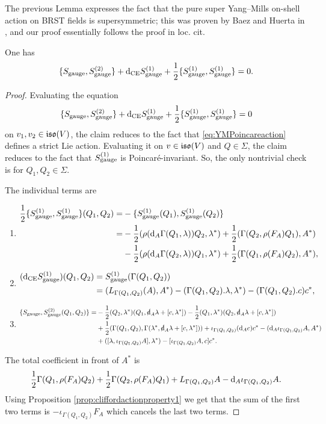\documentclass[10pt, oneside]{article}
\begin{document}
\begin{remark}
The previous Lemma expresses the fact that the pure super Yang--Mills on-shell action on BRST fields is supersymmetric; this was proven by Baez and Huerta in \cite{BaezHuerta}, and our proof essentially follows the proof in loc. cit.
\end{remark}

\begin{lemma}
One has
\[\{S_{\mathrm{gauge}}, S_{\mathrm{gauge}}^{(2)}\} + {\rm d}_{\mathrm{CE}} S_{\mathrm{gauge}}^{(1)} + \frac{1}{2}\{S_{\mathrm{gauge}}^{(1)}, S_{\mathrm{gauge}}^{(1)}\} = 0.\]
\label{lm:gaugemultiplet2}
\end{lemma}
\begin{proof}
Evaluating the equation
\[\{S_{\mathrm{gauge}}, S_{\mathrm{gauge}}^{(2)}\} + {\rm d}_{\mathrm{CE}} S_{\mathrm{gauge}}^{(1)} + \frac{1}{2}\{S_{\mathrm{gauge}}^{(1)}, S_{\mathrm{gauge}}^{(1)}\} = 0\]
on $v_1, v_2\in \mathfrak{iso}(V)$, the claim reduces to the fact that \eqref{eq:YMPoincareaction} defines a strict Lie action. Evaluating it on $v\in\mathfrak{iso}(V)$ and $Q\in\Sigma$, the claim reduces to the fact that $S_{\mathrm{gauge}}^{(1)}$ is Poincar\'{e}-invariant. So, the only nontrivial check is for $Q_1,Q_2\in\Sigma$.

The individual terms are
\begin{enumerate}
\item\begin{align*}
\frac{1}{2}\{S_{\mathrm{gauge}}^{(1)}, S_{\mathrm{gauge}}^{(1)}\}(Q_1, Q_2) = &-\{S_{\mathrm{gauge}}^{(1)}(Q_1), S_{\mathrm{gauge}}^{(1)}(Q_2)\} \\
= &-\frac{1}{2}(\rho({\rm d}_A \Gamma(Q_1, \lambda)) Q_2, \lambda^*) + \frac{1}{2}(\Gamma(Q_2, \rho(F_A)Q_1), A^*) \\
&-\frac{1}{2}(\rho({\rm d}_A \Gamma(Q_2, \lambda)) Q_1, \lambda^*) + \frac{1}{2}(\Gamma(Q_1, \rho(F_A)Q_2), A^*),
\end{align*}
\item\begin{align*}
({\rm d}_{\mathrm{CE}} S_{\mathrm{gauge}}^{(1)})(Q_1, Q_2) &= S_{\mathrm{gauge}}^{(1)}(\Gamma(Q_1, Q_2)) \\
&= (L_{\Gamma(Q_1, Q_2)}(A), A^*) -(\Gamma(Q_1, Q_2).\lambda, \lambda^*) - (\Gamma(Q_1, Q_2).c) c^*,
\end{align*}
\item 
\begin{align*}
\{S_{\gauge}, S_{\gauge}^{(2)}(Q_1, Q_2)\} = &-\frac{1}{2}(Q_2, \lambda^*)(Q_1, \sd{\d}_A \lambda + [c, \lambda^*]) - \frac{1}{2}(Q_1, \lambda^*)(Q_2, \sd{\d}_A \lambda + [c, \lambda^*]) \\
&+\frac{1}{2}(\Gamma(Q_1, Q_2), \Gamma(\lambda^*, \sd{\d}_A \lambda + [c, \lambda^*])) + \iota_{\Gamma(Q_1, Q_2)}(\d_A c) c^* - (\d_A\iota_{\Gamma(Q_1, Q_2)} A, A^*) \\
&+ ([\lambda, \iota_{\Gamma(Q_1, Q_2)}A], \lambda^*) - [\iota_{\Gamma(Q_1, Q_2)} A, c] c^*.
\end{align*}
\end{enumerate}
The total coefficient in front of $A^*$ is
\[\frac{1}{2}\Gamma(Q_1, \rho(F_A)Q_2) + \frac{1}{2}\Gamma(Q_2, \rho(F_A) Q_1) + L_{\Gamma(Q_1, Q_2)} A - {\rm d}_A \iota_{\Gamma(Q_1, Q_2)} A.\]
Using Proposition \ref{prop:cliffordactionproperty1} we get that the sum of the first two terms is $-\iota_{\Gamma(Q_1, Q_2)}F_A$ which cancels the last two terms.


\end{proof}
\end{document}
